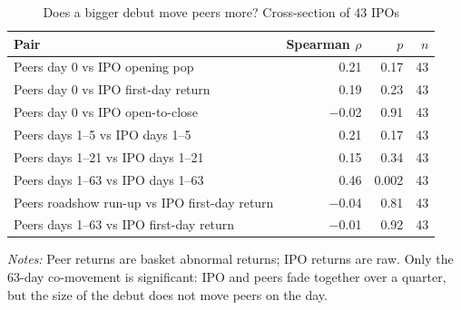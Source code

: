\begin{table}[!htbp]\centering\footnotesize
\caption{Does a bigger debut move peers more? Cross-section of 43 IPOs}\label{tab:b3}

\begin{threeparttable}
\begin{tabular}{lrrr}
\toprule
Pair & Spearman $\rho$ & $p$ & $n$ \\
\midrule
Peers day 0 vs IPO opening pop & 0.21 & 0.17 & 43 \\
Peers day 0 vs IPO first-day return & 0.19 & 0.23 & 43 \\
Peers day 0 vs IPO open-to-close & $-$0.02 & 0.91 & 43 \\
Peers days 1--5 vs IPO days 1--5 & 0.21 & 0.17 & 43 \\
Peers days 1--21 vs IPO days 1--21 & 0.15 & 0.34 & 43 \\
Peers days 1--63 vs IPO days 1--63 & 0.46 & 0.002 & 43 \\
Peers roadshow run-up vs IPO first-day return & $-$0.04 & 0.81 & 43 \\
Peers days 1--63 vs IPO first-day return & $-$0.01 & 0.92 & 43 \\
\bottomrule
\end{tabular}
\begin{tablenotes}[flushleft]\footnotesize
\item \textit{Notes:} Peer returns are basket abnormal returns; IPO returns are raw. Only the 63-day co-movement is significant: IPO and peers fade together over a quarter, but the size of the debut does not move peers on the day.
\end{tablenotes}
\end{threeparttable}

\end{table}
